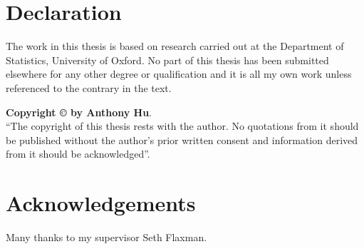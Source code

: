 

\chapter*{Declaration}
The work in this thesis is based on research carried out at the Department of Statistics, University of Oxford. No part of this thesis has been submitted elsewhere for any other degree or qualification and it is all my own work unless referenced to the contrary in the text.


\vfill
\noindent \textbf{Copyright \copyright{} by Anthony Hu}.\\
``The copyright of this thesis rests with the author.  No quotations
from it should be published without the author's prior written consent
and information derived from it should be acknowledged''.



\chapter*{Acknowledgements}
Many thanks to my supervisor Seth Flaxman.

